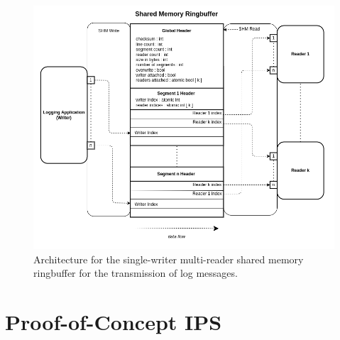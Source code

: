 \begin{figure}[p]
    \includegraphics[width=\textwidth]{images/shm_architecture.png}
    \caption[Shared Memory Architecture]{Architecture for the single-writer multi-reader shared memory ringbuffer for the transmission
    of log messages. }
\end{figure}

\section{Proof-of-Concept IPS}

